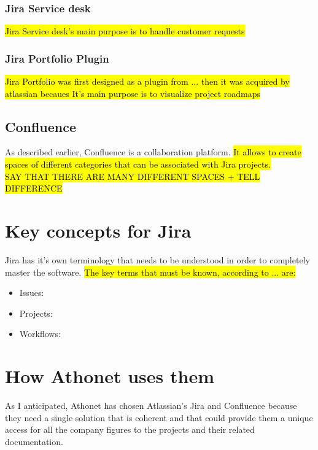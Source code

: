		\subsubsection{Jira Service desk}
			\hl{Jira Service desk's main purpose is to handle customer requests}

		\subsubsection{Jira Portfolio Plugin}
			\hl{Jira Portfolio was first designed as a plugin from ... then it was acquired by atlassian becaues
			It's main purpose is to visualize project roadmaps}
		
	\subsection{Confluence}
		As described earlier, Confluence is a collaboration platform.
		\hl{It allows to create spaces of different categories that can be associated with Jira projects.\\SAY THAT THERE ARE MANY DIFFERENT SPACES + TELL DIFFERENCE}
		
		
\section{Key concepts for Jira}
	Jira has it's own terminology that needs to be understood in order to completely master the software.	
	\hl{The key terms that must be known, according to ... are:}
	\begin{itemize}
		\item Issues: 
		\item Projects: 
		\item Workflows: 
	\end{itemize}
	
\section{How Athonet uses them}
	As I anticipated, Athonet has chosen Atlassian's Jira and Confluence because they need a single solution that is coherent and that could provide them a unique access for all the company figures to the projects and their related documentation.
	
